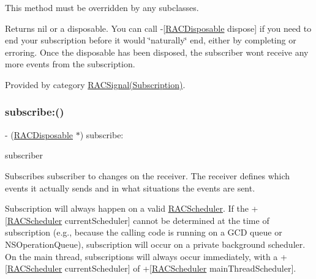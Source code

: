 This method must be overridden by any subclasses.

Returns nil or a disposable. You can call -\/\mbox{[}\mbox{\hyperlink{interface_r_a_c_disposable}{R\+A\+C\+Disposable}} dispose\mbox{]} if you need to end your subscription before it would \char`\"{}naturally\char`\"{} end, either by completing or erroring. Once the disposable has been disposed, the subscriber won\textquotesingle{}t receive any more events from the subscription. 

Provided by category \mbox{\hyperlink{category_r_a_c_signal_07_subscription_08_aeab76d632d98bbc321ec5e19575377eb}{R\+A\+C\+Signal(\+Subscription)}}.

\mbox{\label{interface_r_a_c_signal_aeab76d632d98bbc321ec5e19575377eb}} 
\subsubsection{\texorpdfstring{subscribe\+:()}{subscribe:()}\hspace{0.1cm}{\footnotesize\ttfamily [3/3]}}
{\footnotesize\ttfamily -\/ (\mbox{\hyperlink{interface_r_a_c_disposable}{R\+A\+C\+Disposable}} $\ast$) subscribe\+: \begin{DoxyParamCaption}\item[{(id$<$ \mbox{\hyperlink{interface_r_a_c_subscriber}{R\+A\+C\+Subscriber}} $>$)}]{subscriber }\end{DoxyParamCaption}}

Subscribes {\ttfamily subscriber} to changes on the receiver. The receiver defines which events it actually sends and in what situations the events are sent.

Subscription will always happen on a valid \mbox{\hyperlink{interface_r_a_c_scheduler}{R\+A\+C\+Scheduler}}. If the +\mbox{[}\mbox{\hyperlink{interface_r_a_c_scheduler}{R\+A\+C\+Scheduler}} current\+Scheduler\mbox{]} cannot be determined at the time of subscription (e.\+g., because the calling code is running on a G\+CD queue or N\+S\+Operation\+Queue), subscription will occur on a private background scheduler. On the main thread, subscriptions will always occur immediately, with a +\mbox{[}\mbox{\hyperlink{interface_r_a_c_scheduler}{R\+A\+C\+Scheduler}} current\+Scheduler\mbox{]} of +\mbox{[}\mbox{\hyperlink{interface_r_a_c_scheduler}{R\+A\+C\+Scheduler}} main\+Thread\+Scheduler\mbox{]}.

